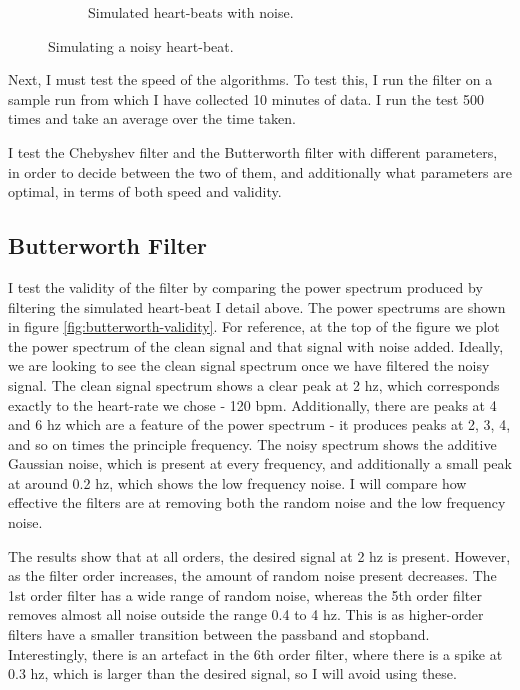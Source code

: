 \documentclass[12pt,a4paper,twoside,openany]{report}
\begin{document}
\begin{figure}
\begin{subfigure}[b]{0.6\textwidth}
		\caption{Simulated heart-beats with noise.}
		\label{fig:sim-beats-noise}
	\end{subfigure}
	\caption{Simulating a noisy heart-beat.}
\end{figure}

Next, I must test the speed of the algorithms. To test this, I run the filter
on a sample run from which I have collected 10 minutes of data. I run the test
500 times and take an average over the time taken.

I test the Chebyshev filter and the Butterworth filter with different
parameters, in order to decide between the two of them, and additionally what
parameters are optimal, in terms of both speed and validity.

\subsection{Butterworth Filter}

I test the validity of the filter by comparing the power spectrum produced by
filtering the simulated heart-beat I detail above. The power spectrums are
shown in figure 
\ref{fig:butterworth-validity}. For reference, at the top of the figure we
plot the power spectrum of the clean signal and that signal with noise added.
Ideally, we are looking to see the clean signal spectrum once we have filtered the
noisy signal. The clean signal spectrum shows a clear peak at 2 hz, which
corresponds exactly to the heart-rate we chose - 120 bpm. Additionally, there
are peaks at 4 and 6 hz which are a feature of the power spectrum - it
produces peaks at 2, 3, 4, and so on times the principle frequency. The noisy
spectrum shows the additive Gaussian noise, which is present at every
frequency, and additionally a small peak at around 0.2 hz, which shows the low
frequency noise. I will compare how effective the filters are at removing both
the random noise and the low frequency noise.

The results show that at all orders, the desired signal at 2 hz is present.
However, as the filter order increases, the amount of random noise present
decreases. The 1st order filter has a wide range of random noise, whereas the
5th order filter removes almost all noise outside the range 0.4 to 4 hz. This
is as higher-order filters have a smaller transition between the passband and
stopband.
Interestingly, there is an artefact in the 6th order filter, where there is a
spike at 0.3 hz, which is larger than the desired signal, so I will avoid
using these. 
\end{document}

